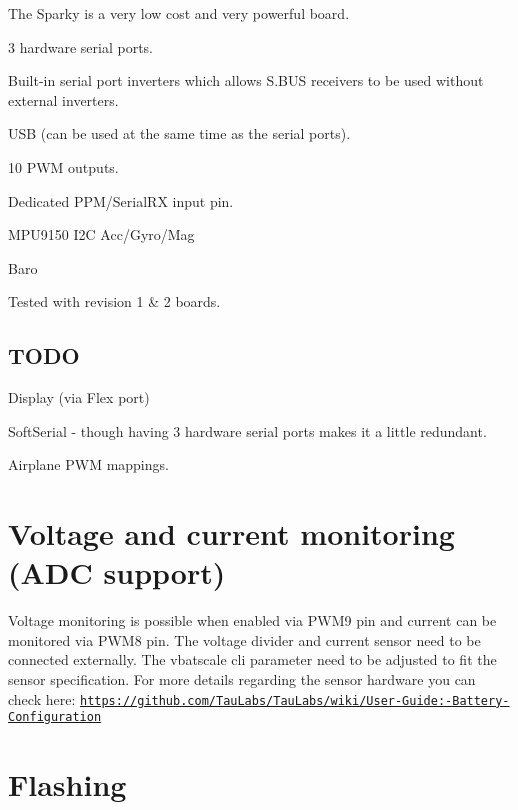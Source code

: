 The Sparky is a very low cost and very powerful board.


\begin{DoxyItemize}
\item 3 hardware serial ports.
\item Built-\/in serial port inverters which allows S.\+B\+U\+S receivers to be used without external inverters.
\item U\+S\+B (can be used at the same time as the serial ports).
\item 10 P\+W\+M outputs.
\item Dedicated P\+P\+M/\+Serial\+R\+X input pin.
\item M\+P\+U9150 I2\+C Acc/\+Gyro/\+Mag
\item Baro
\end{DoxyItemize}

Tested with revision 1 \& 2 boards.

\subsection*{T\+O\+D\+O}


\begin{DoxyItemize}
\item Display (via Flex port)
\item Soft\+Serial -\/ though having 3 hardware serial ports makes it a little redundant.
\item Airplane P\+W\+M mappings.
\end{DoxyItemize}

\section*{Voltage and current monitoring (A\+D\+C support)}

Voltage monitoring is possible when enabled via P\+W\+M9 pin and current can be monitored via P\+W\+M8 pin. The voltage divider and current sensor need to be connected externally. The vbatscale cli parameter need to be adjusted to fit the sensor specification. For more details regarding the sensor hardware you can check here\+: \href{https://github.com/TauLabs/TauLabs/wiki/User-Guide:-Battery-Configuration}{\tt https\+://github.\+com/\+Tau\+Labs/\+Tau\+Labs/wiki/\+User-\/\+Guide\+:-\/\+Battery-\/\+Configuration}

\section*{Flashing}

